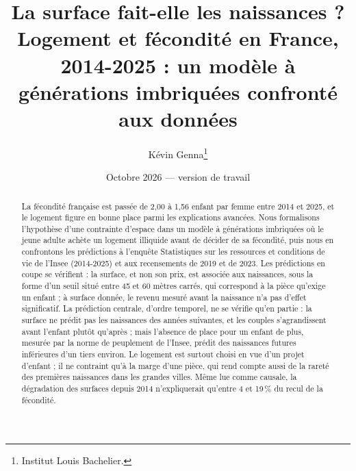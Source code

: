\documentclass[11pt,a4paper]{article}
\title{La surface fait-elle les naissances ?\\[0.3em]
\large Logement et fécondité en France, 2014-2025 : un modèle à générations imbriquées confronté aux données}
\author{Kévin Genna\thanks{Institut Louis Bachelier.}}
\date{Octobre 2026 — version de travail}
\theoremstyle{plain}
\theoremstyle{definition}
\theoremstyle{remark}
\begin{document}
\maketitle

\begin{abstract}
\noindent La fécondité française est passée de 2,00 à 1,56 enfant par femme entre 2014 et 2025, et le logement figure en bonne place parmi les explications avancées. Nous formalisons l'hypothèse d'une contrainte d'espace dans un modèle à générations imbriquées où le jeune adulte achète un logement illiquide avant de décider de sa fécondité, puis nous en confrontons les prédictions à l'enquête Statistiques sur les ressources et conditions de vie de l'Insee (2014-2025) et aux recensements de 2019 et de 2023. Les prédictions en coupe se vérifient : la surface, et non son prix, est associée aux naissances, sous la forme d'un seuil situé entre 45 et 60 mètres carrés, qui correspond à la pièce qu'exige un enfant ; à surface donnée, le revenu mesuré avant la naissance n'a pas d'effet significatif. La prédiction centrale, d'ordre temporel, ne se vérifie qu'en partie : la surface ne prédit pas les naissances des années suivantes, et les couples s'agrandissent avant l'enfant plutôt qu'après ; mais l'absence de place pour un enfant de plus, mesurée par la norme de peuplement de l'Insee, prédit des naissances futures inférieures d'un tiers environ. Le logement est surtout choisi en vue d'un projet d'enfant ; il ne contraint qu'à la marge d'une pièce, qui rend compte aussi de la rareté des premières naissances dans les grandes villes. Même lue comme causale, la dégradation des surfaces depuis 2014 n'expliquerait qu'entre 4 et 19\,\% du recul de la fécondité.
\end{abstract}
\end{document}
